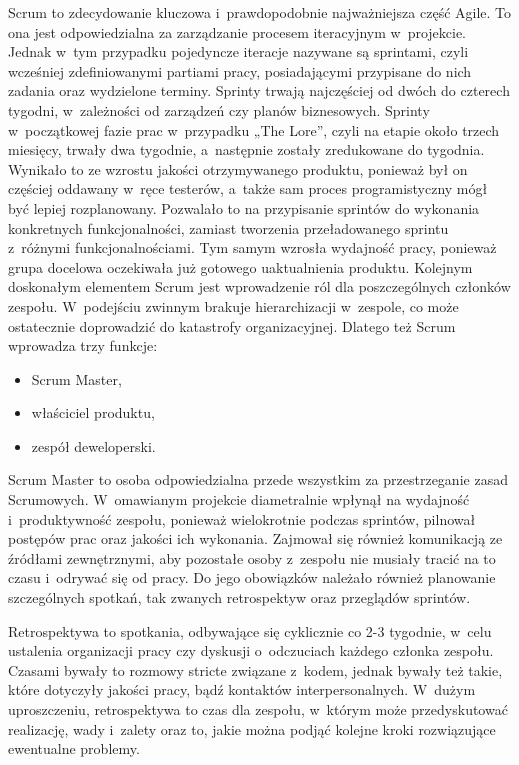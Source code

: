 \documentclass[oneside,polski,logo]{amuthesis}
\begin{document}
Scrum to zdecydowanie kluczowa i~prawdopodobnie najważniejsza część Agile. To ona jest odpowiedzialna za zarządzanie procesem iteracyjnym w~projekcie. Jednak w~tym przypadku pojedyncze iteracje nazywane są sprintami, czyli wcześniej zdefiniowanymi partiami pracy, posiadającymi przypisane do nich zadania oraz wydzielone terminy. Sprinty trwają najczęściej od dwóch do czterech tygodni, w~zależności od zarządzeń czy planów biznesowych. Sprinty w~początkowej fazie prac w~przypadku „The Lore”, czyli na etapie około trzech miesięcy, trwały dwa tygodnie, a~następnie zostały zredukowane do tygodnia. Wynikało to ze wzrostu jakości otrzymywanego produktu, ponieważ był on częściej oddawany w~ręce testerów, a~także sam proces programistyczny mógł być lepiej rozplanowany. Pozwalało to na przypisanie sprintów do wykonania konkretnych funkcjonalności, zamiast tworzenia przeładowanego sprintu z~różnymi funkcjonalnościami. Tym samym wzrosła wydajność pracy, ponieważ grupa docelowa oczekiwała już gotowego uaktualnienia produktu. Kolejnym doskonałym elementem Scrum jest wprowadzenie ról dla poszczególnych członków zespołu. W~podejściu zwinnym brakuje hierarchizacji w~zespole, co może ostatecznie doprowadzić do katastrofy organizacyjnej. \cite{agileHunt} Dlatego też Scrum wprowadza trzy funkcje:

\begin{itemize}
	\item Scrum Master,
	\item właściciel produktu,
	\item zespół deweloperski.
\end{itemize}

Scrum Master to osoba odpowiedzialna przede wszystkim za przestrzeganie zasad Scrumowych. W~omawianym projekcie diametralnie wpłynął na wydajność i~produktywność zespołu, ponieważ wielokrotnie podczas sprintów, pilnował postępów prac oraz jakości ich wykonania. Zajmował się również komunikacją ze źródłami zewnętrznymi, aby pozostałe osoby z~zespołu nie musiały tracić na to czasu i~odrywać się od pracy. Do jego obowiązków należało również planowanie szczególnych spotkań, tak zwanych retrospektyw oraz przeglądów sprintów.

Retrospektywa to spotkania, odbywające się cyklicznie co 2-3 tygodnie, w~celu ustalenia organizacji pracy czy dyskusji o~odczuciach każdego członka zespołu. Czasami bywały to rozmowy stricte związane z~kodem, jednak bywały też takie, które dotyczyły jakości pracy, bądź kontaktów interpersonalnych. W~dużym uproszczeniu, retrospektywa to czas dla zespołu, w~którym może przedyskutować realizację, wady i~zalety oraz to, jakie można podjąć kolejne kroki rozwiązujące ewentualne problemy.
\end{document}
